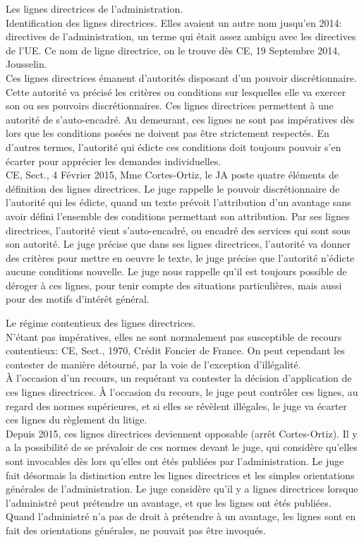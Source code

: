 \documentclass[10pt, a4paper, openany]{book}
\begin{document}
Les lignes directrices de l'administration. \\
Identification des lignes directrices. Elles avaient un autre nom jusqu'en 2014: directives de l'administration, un terme qui était assez ambigu avec les directives de l'UE. Ce nom de ligne directrice, on le trouve dès CE, 19 Septembre 2014, Jousselin. \\
Ces lignes directrices émanent d'autorités disposant d'un pouvoir discrétionnaire. Cette autorité va précisé les critères ou conditions sur lesquelles elle va exercer son ou ses pouvoirs discrétionnaires. Ces lignes directrices permettent à une autorité de s'auto-encadré. Au demeurant, ces lignes ne sont pas impératives dès lors que les conditions posées ne doivent pas être strictement respectés. En d'autres termes, l'autorité qui édicte ces conditions doit toujours pouvoir s'en écarter pour apprécier les demandes individuelles. \\
CE, Sect., 4 Février 2015, Mme Cortes-Ortiz, le JA poste quatre éléments de définition des lignes directrices. Le juge rappelle le pouvoir discrétionnaire de l'autorité qui les édicte, quand un texte prévoit l'attribution d'un avantage sans avoir défini l'ensemble des conditions permettant son attribution. Par ses lignes directrices, l'autorité vient s'auto-encadré, ou encadré des services qui sont sous son autorité. Le juge précise que dans ses lignes directrices, l'autorité va donner des critères pour mettre en oeuvre le texte, le juge précise que l'autorité n'édicte aucune conditions nouvelle. Le juge nous rappelle qu'il est toujours possible de déroger à ces lignes, pour tenir compte des situations particulières, mais aussi pour des motifs d'intérêt général. 


Le régime contentieux des lignes directrices. \\
N'étant pas impératives, elles ne sont normalement pas susceptible de recours contentieux: CE, Sect., 1970, Crédit Foncier de France. On peut cependant les contester de manière détourné, par la voie de l'exception d'illégalité. \\
À l'occasion d'un recours, un requérant va contester la décision d'application de ces lignes directrices. À l'occasion du recours, le juge peut contrôler ces lignes, au regard des normes supérieures, et si elles se révèlent illégales, le juge va écarter ces lignes du règlement du litige. \\
Depuis 2015, ces lignes directrices deviennent opposable (arrêt Cortes-Ortiz). Il y a la possibilité de se prévaloir de ces normes devant le juge, qui considère qu'elles sont invocables dès lors qu'elles ont étés publiées par l'administration. Le juge fait désormais la distinction entre les lignes directrices et les simples orientations générales de l'administration. Le juge considère qu'il y a lignes directrices lorsque l'administré peut prétendre un avantage, et que les lignes ont étés publiées. Quand l'administré n'a pas de droit à prétendre à un avantage, les lignes sont en fait des orientations générales, ne pouvait pas être invoqués. 
\end{document}
